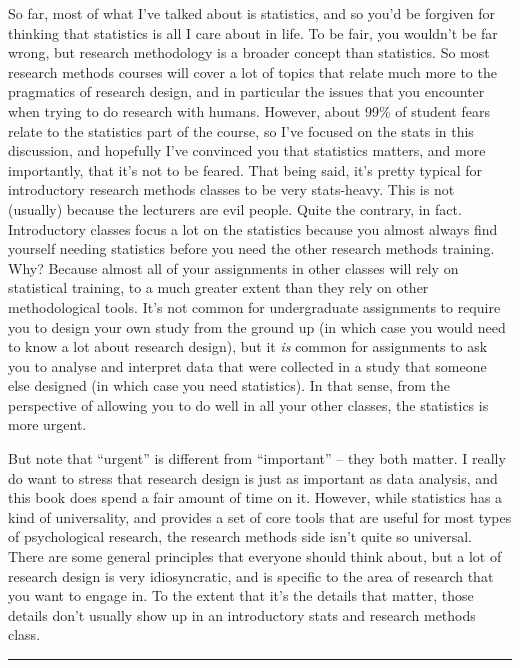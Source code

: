 \documentclass[
]{book}
\begin{document}
So far, most of what I've talked about is statistics, and so you'd be forgiven for thinking that statistics is all I care about in life. To be fair, you wouldn't be far wrong, but research methodology is a broader concept than statistics. So most research methods courses will cover a lot of topics that relate much more to the pragmatics of research design, and in particular the issues that you encounter when trying to do research with humans. However, about 99\% of student fears relate to the statistics part of the course, so I've focused on the stats in this discussion, and hopefully I've convinced you that statistics matters, and more importantly, that it's not to be feared. That being said, it's pretty typical for introductory research methods classes to be very stats-heavy. This is not (usually) because the lecturers are evil people. Quite the contrary, in fact. Introductory classes focus a lot on the statistics because you almost always find yourself needing statistics before you need the other research methods training. Why? Because almost all of your assignments in other classes will rely on statistical training, to a much greater extent than they rely on other methodological tools. It's not common for undergraduate assignments to require you to design your own study from the ground up (in which case you would need to know a lot about research design), but it \emph{is} common for assignments to ask you to analyse and interpret data that were collected in a study that someone else designed (in which case you need statistics). In that sense, from the perspective of allowing you to do well in all your other classes, the statistics is more urgent.

But note that ``urgent'' is different from ``important'' -- they both matter. I really do want to stress that research design is just as important as data analysis, and this book does spend a fair amount of time on it. However, while statistics has a kind of universality, and provides a set of core tools that are useful for most types of psychological research, the research methods side isn't quite so universal. There are some general principles that everyone should think about, but a lot of research design is very idiosyncratic, and is specific to the area of research that you want to engage in. To the extent that it's the details that matter, those details don't usually show up in an introductory stats and research methods class.

\begin{center}\rule{0.5\linewidth}{0.5pt}\end{center}
\end{document}
